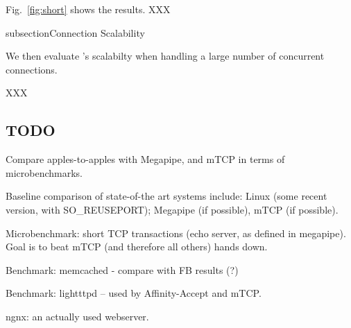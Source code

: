 Fig.~\ref{fig:short} shows the results. XXX


subsection{Connection Scalability}

We then evaluate \ix's scalabilty when handling a large number of concurrent connections. 

XXX


\subsection{TODO}

\todo Compare apples-to-apples with Megapipe, and mTCP in terms of microbenchmarks.

\todo Baseline comparison of state-of-the art systems include:  Linux (some recent version, with SO\_REUSEPORT); Megapipe (if possible), mTCP (if possible). 

\todo Microbenchmark: short TCP transactions (echo server, as defined in megapipe).   Goal is to beat mTCP (and therefore all others) hands down.

\todo Benchmark: memcached - compare with FB results (?)

\todo Benchmark: lightttpd -- used by Affinity-Accept and mTCP.  

\todo ngnx: an actually used webserver.

